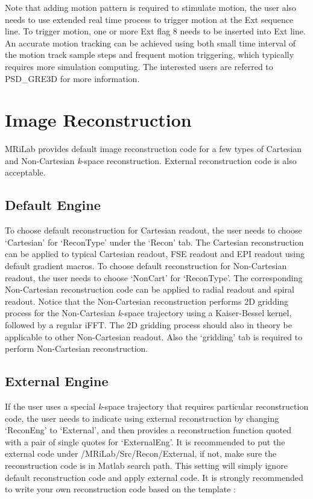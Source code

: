\documentclass{book}%
\begin{document}
Note that adding motion pattern is required to stimulate motion, the user also needs to use extended real time process to trigger motion at the Ext sequence line. To trigger motion, one or more Ext flag 8 needs to be inserted into Ext line. An accurate motion tracking can be achieved using both small time interval of the motion track sample steps and frequent motion triggering, which typically requires more simulation computing. The interested users are referred to PSD\_GRE3D for more information.

\section{Image Reconstruction}

MRiLab provides default image reconstruction code for a few types of Cartesian and Non-Cartesian \textit{k}-space reconstruction. External reconstruction code is also acceptable.

\subsection{Default Engine}

To choose default reconstruction for Cartesian readout, the user needs to choose `Cartesian' for `ReconType' under the `Recon' tab. The Cartesian reconstruction can be applied to typical Cartesian readout, FSE readout and EPI readout using default gradient macros. To choose default reconstruction for Non-Cartesian readout, the user needs to choose `NonCart' for `ReconType'. The corresponding Non-Cartesian reconstruction code can be applied to radial readout and spiral readout. Notice that the Non-Cartesian reconstruction performs 2D gridding process for the Non-Cartesian \textit{k}-space trajectory using a Kaiser-Bessel kernel, followed by a regular iFFT. The 2D gridding process should also in theory be applicable to other Non-Cartesian readout. Also the `gridding' tab is required to perform Non-Cartesian reconstruction.


\subsection{External Engine}

If the user uses a special \textit{k}-space trajectory that requires particular reconstruction code, the user needs to indicate using external reconstruction by changing `ReconEng' to `External', and then provides a reconstruction function quoted with a pair of single quotes for `ExternalEng'. It is recommended to put the external code under /MRiLab/Src/Recon/External, if not, make sure the reconstruction code is in Matlab search path. This setting will simply ignore default reconstruction code and apply external code. It is strongly recommended to write your own reconstruction code based on the template :
\end{document}

